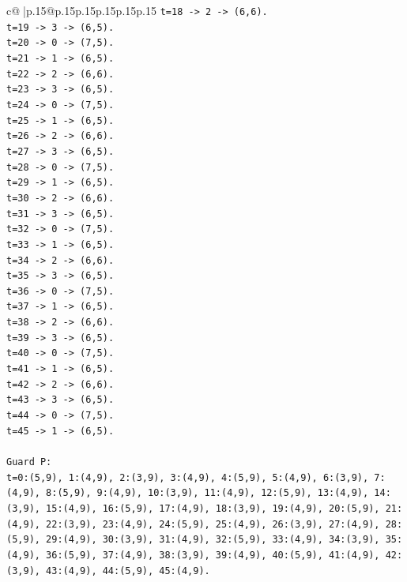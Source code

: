 \documentclass{article}
\begin{document}
{\begin{supertabular}{c@{$\;$}|p{.15\linewidth}@{}p{.15\linewidth}p{.15\linewidth}p{.15\linewidth}p{.15\linewidth}p{.15\linewidth}}
{{{\texttt{t=18 {-}> 2 {-}> (6,6).} \\
\texttt{t=19 {-}> 3 {-}> (6,5).} \\
\texttt{t=20 {-}> 0 {-}> (7,5).} \\
\texttt{t=21 {-}> 1 {-}> (6,5).} \\
\texttt{t=22 {-}> 2 {-}> (6,6).} \\
\texttt{t=23 {-}> 3 {-}> (6,5).} \\
\texttt{t=24 {-}> 0 {-}> (7,5).} \\
\texttt{t=25 {-}> 1 {-}> (6,5).} \\
\texttt{t=26 {-}> 2 {-}> (6,6).} \\
\texttt{t=27 {-}> 3 {-}> (6,5).} \\
\texttt{t=28 {-}> 0 {-}> (7,5).} \\
\texttt{t=29 {-}> 1 {-}> (6,5).} \\
\texttt{t=30 {-}> 2 {-}> (6,6).} \\
\texttt{t=31 {-}> 3 {-}> (6,5).} \\
\texttt{t=32 {-}> 0 {-}> (7,5).} \\
\texttt{t=33 {-}> 1 {-}> (6,5).} \\
\texttt{t=34 {-}> 2 {-}> (6,6).} \\
\texttt{t=35 {-}> 3 {-}> (6,5).} \\
\texttt{t=36 {-}> 0 {-}> (7,5).} \\
\texttt{t=37 {-}> 1 {-}> (6,5).} \\
\texttt{t=38 {-}> 2 {-}> (6,6).} \\
\texttt{t=39 {-}> 3 {-}> (6,5).} \\
\texttt{t=40 {-}> 0 {-}> (7,5).} \\
\texttt{t=41 {-}> 1 {-}> (6,5).} \\
\texttt{t=42 {-}> 2 {-}> (6,6).} \\
\texttt{t=43 {-}> 3 {-}> (6,5).} \\
\texttt{t=44 {-}> 0 {-}> (7,5).} \\
\texttt{t=45 {-}> 1 {-}> (6,5).} \\
\\ 
\texttt{Guard P:} \\
\texttt{t=0:(5,9), 1:(4,9), 2:(3,9), 3:(4,9), 4:(5,9), 5:(4,9), 6:(3,9), 7:(4,9), 8:(5,9), 9:(4,9), 10:(3,9), 11:(4,9), 12:(5,9), 13:(4,9), 14:(3,9), 15:(4,9), 16:(5,9), 17:(4,9), 18:(3,9), 19:(4,9), 20:(5,9), 21:(4,9), 22:(3,9), 23:(4,9), 24:(5,9), 25:(4,9), 26:(3,9), 27:(4,9), 28:(5,9), 29:(4,9), 30:(3,9), 31:(4,9), 32:(5,9), 33:(4,9), 34:(3,9), 35:(4,9), 36:(5,9), 37:(4,9), 38:(3,9), 39:(4,9), 40:(5,9), 41:(4,9), 42:(3,9), 43:(4,9), 44:(5,9), 45:(4,9).} \\
}}}
\end{supertabular}}
\end{document}
